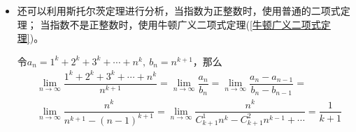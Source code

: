 \begin{itemize}[leftmargin=\inteval{\myitemleftmargin}pt,itemsep=
   \inteval{\myitemitempsep}pt,topsep=\inteval{\myitemtopsep}pt]
\noindent 下面来解释为什么(\ref{负二分之一次方求和})$ \sim $ (\ref{3.5次方求和})式能成立。
$ \sum\limits_{l=1}^{n} l^{\alpha} $的主要部分是$ \dfrac{n^{\alpha+1}}
{\alpha+1}\ (\alpha>-1) $，可从定积分估计的求和上界与下界的平均值的角度来理解，
\begin{align*}
    \int_0^n x^{\alpha}\d x= \dfrac{n^{\alpha+1}}{\alpha+1} < \sum\limits_{l=1}^{n} l^{\alpha}
    < \int_0^{n+1}x^{\alpha} \d x= \dfrac{(n+1)^{\alpha+1}}{\alpha+1}  
\end{align*}
函数$ f(x)=\dfrac{x^{\alpha+1}}{\alpha+1} $
在$ x=n $处的切线为$ g(x)=n^{\alpha}(x-n)+\dfrac{n^{\alpha+1}}{\alpha+1} $，
可以用$ g(n+1)=n^{\alpha}+\dfrac{n^{\alpha+1}}{\alpha+1} $近似代替$ f(n+1) $，
因为$ f(n)<\sum\limits_{l=1}^{n} l^{\alpha}<f(n+1) $，所以，用$ f(n) $
和$ f(n+1) $的平均值来代替$ \sum\limits_{l=1}^{n} l^{\alpha} $，将具有更高的精度。
$ \sum\limits_{l=1}^{n} l^{\alpha} \approx \dfrac{f(n)+f(n+1)}{2}\approx \dfrac{g(n)+g(n+1)}{2}=
g\left(n+\dfrac{1}{2}\right) =\dfrac{n^{\alpha+1}}{\alpha+1}+ \dfrac{1}{2}n^{\alpha} $.  

也可以把积分的起点和终点移动$ \dfrac{1}{2} $，
\begin{gather*}
    \sum\limits_{l=1}^{n} l^{\alpha} \approx \int_{1/2}^{n+1/2} x^{\alpha}\d x 
    \approx \dfrac{\left(n+\dfrac{1}{2}\right)^{\alpha+1}}{\alpha+1} 
    \approx g\left(n+\dfrac{1}{2}\right)=
    \dfrac{n^{\alpha+1}}{\alpha+1}+ \dfrac{1}{2}n^{\alpha}
\end{gather*}

\item 还可以利用斯托尔茨定理进行分析，当指数为正整数时，使用普通的二项式定理；
当指数不是正整数时，使用牛顿广义二项式定理(\ref{牛顿广义二项式定理})。

令$ a_n=1^k+2^k+3^k+\cdots +n^k,\ b_n=n^{k+1} $，那么
\begin{align*}
    & \lim_{n\to \infty}\dfrac{1^k+2^k+3^k+\cdots +n^k}{n^{k+1}} =
    \lim_{n\to \infty}\dfrac{a_n}{b_n}=
    \lim_{n\to \infty}\dfrac{a_n-a_{n-1}}{b_n-b_{n-1}}= \\
    & \lim_{n\to \infty}\dfrac{n^k}{n^{k+1}-(n-1)^{k+1}}=
    \lim_{n\to \infty}\dfrac{n^k}{C_{k+1}^1 n^k -C_{k+1}^2 n^{k-1}+\cdots} = \dfrac{1}{k+1}     
\end{align*}


\end{itemize}
